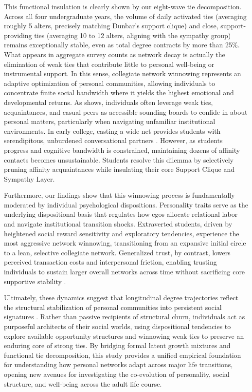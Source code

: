 \documentclass[12pt]{article}
\begin{document}
This functional insulation is clearly shown by our eight-wave tie decomposition. Across all four undergraduate years, the volume of daily activated ties (averaging roughly 5 alters, precisely matching Dunbar's support clique) and close, support-providing ties (averaging 10 to 12 alters, aligning with the sympathy group) remains exceptionally stable, even as total degree contracts by more than 25\%. What appears in aggregate survey counts as network decay is actually the elimination of weak ties that contribute little to personal well-being or instrumental support. In this sense, collegiate network winnowing represents an adaptive optimization of personal communities, allowing individuals to concentrate finite social bandwidth where it yields the highest emotional and developmental returns. As \citet{small2017someone} shows, individuals often leverage weak ties, acquaintances, and casual peers as accessible sounding boards to confide in about personal matters, particularly when navigating unfamiliar institutional environments. In early college, casting a wide net provides students with serendipitous, unburdened conversational partners \citep{small2017someone}. However, as students progress and cognitive bandwidth is constrained, maintaining dozens of affinity contacts becomes unsustainable. Students resolve this dilemma by selectively pruning affinity acquaintances while insulating their core Support Clique and Sympathy Layer.

Furthermore, our findings show that this winnowing process is fundamentally moderated by individual psychological dispositions. Personality traits serve as the underlying dispositional basis that regulates how egos allocate relational labor and navigate institutional transition shocks. Extraverted students, driven by heightened social reward sensitivity and exploratory tendencies, experience the most aggressive network winnowing, transitioning from an expansive initial circle to a lean, selective collegiate network. Generalized trust, by contrast, lowers perceived transaction costs and interpersonal friction, enabling trusting individuals to sustain larger overall networks across time without sacrificing core supportive stability \citep{yamagishi2011trust}.

Ultimately, these dynamics suggest that longitudinal degree trajectories reflect the structural stabilization of personal communities into persistent social signatures \citep{saramaki2014persistence, heydari2018multichannel}. Rather than passive recipients of structural churn, individuals act as purposeful architects of their social worlds, using dispositional tendencies to explore available opportunity structures and winnowing weak ties to preserve an enduring core of strong ties. By bridging formal latent growth mixtures and functional tie decomposition, this study provides a unified empirical foundation for understanding how personal networks adapt across major life transitions, opening new avenues for investigating the co-evolution of personality, social structure, and well-being across the adult life course.

\clearpage


\end{document}

